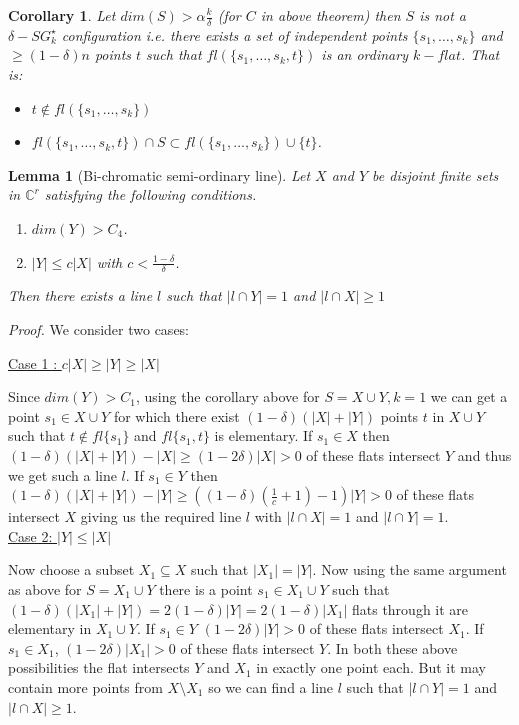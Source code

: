\documentclass[12pt]{caltech_thesis}
\theoremstyle{plain}
\newtheorem{corollary}{Corollary}
\newtheorem{lemma}{Lemma}
\theoremstyle{definition}
\newcommand{\C}{\mathbb{C}}
\begin{document}
\begin{corollary} \label{elementary}
 Let $dim(S)> \alpha\frac{k}{\delta}$ (for $C$ in above theorem) then $S$ is not a $\delta-SG_k^{\star}$
configuration i.e. there exists a set of independent points $\{s_1,\ldots,s_k\}$
 and $\geq (1-\delta)n$ points $t$ such that $fl(\{s_1,\ldots,s_k,t\})$ is an
ordinary $k - flat$. That is:
 \begin{itemize}
  \item $t\notin fl(\{s_1,\ldots,s_k\})$
  \item $fl(\{s_1,\ldots,s_k,t\}) \cap S \subset fl(\{s_1,\ldots,s_k\})\cup \{t\}$.
 \end{itemize}

\end{corollary}

\begin{lemma}[Bi-chromatic semi-ordinary line]\label{lemma:bichromatic}
 Let $X$ and $Y$ be disjoint finite sets in $\C^r$ satisfying the following
conditions.
\begin{enumerate}
\item $dim(Y)>C_4$.
\item $|Y|\leq  c|X|$ with $c < \frac{1-\delta}{\delta}$.
\end{enumerate}
Then there exists a line $l$ such that $|l\cap Y|=1$ and $|l\cap X|\geq 1$
\end{lemma}


\emph{Proof.}
We consider two cases:

\underline{Case 1 : $c|X|\geq |Y|\geq |X|$}

Since $dim(Y)>C_1$, using the corollary above for $S=X\cup Y, k=1$ we can get a
point $s_1 \in X\cup Y$ for which there exist $(1-\delta)(|X|+|Y|)$ points $t$
in $X\cup Y$
such that $t\notin fl\{s_1\}$ and $fl\{s_1,t\}$ is elementary.
If $s_1\in X$ then $(1-\delta)(|X|+|Y|)-|X| \geq (1-2\delta)|X|>0$ of these
flats intersect $Y$ and thus we get such a line $l$. If $s_1\in Y$ then
$(1-\delta)(|X|+|Y|)-|Y| \geq ((1-\delta)(\frac{1}{c}+1) -1)|Y| >0$ of these
flats intersect $X$ giving us the required line $l$ with $|l\cap X|=1$ and
$|l\cap Y|=1$.\\

\underline{Case 2: $|Y|\leq |X|$}

 Now choose a subset $X_1\subseteq X$ such that $|X_1|=|Y|$. Now using the same
argument
as above for $S = X_1\cup Y$ there is a point $s_1\in X_1\cup Y$ such that
$(1-\delta) (|X_1|+|Y|)= 2(1-\delta) |Y| = 2(1-\delta) |X_1|$ flats through
it are elementary in $X_1\cup Y$. If $s_1\in Y$ $(1-2\delta)|Y|>0$ of these
flats intersect $X_1$. If $s_1\in X_1$,
$(1-2\delta)|X_1| >0$ of these flats intersect $Y$. In both these above
possibilities the flat intersects $Y$ and $X_1$ in
exactly one point each. But it may contain more points from $X\setminus X_1$ so
we can find a line $l$ such that $|l\cap Y|=1$
and $|l\cap X|\geq 1$.




\end{document}
